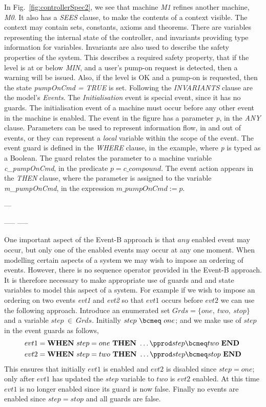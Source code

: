 %
%
%
 In Fig.~\ref{fig:controllerSpec2}, we see that machine \emph{M1} refines another machine, \emph{M0}. It also has a \emph{SEES} clause, to make the contents of a context visible. The context may contain sets, constants, axioms and theorems. There are variables representing the internal state of the controller, and invariants providing type information for variables. Invariants are also used to describe the safety properties of the system. This describes a required safety property, that if the level is at or below \emph{MIN}, and a user's pump-on request is detected, then a warning will be issued. Also, if the level is OK and a pump-on is requested, then the state \emph{pumpOnCmd = TRUE} is  set.  Following the \emph{INVARIANTS} clause are the model's \emph{Events}. The \emph{Initialisation} event is special event, since it has no guards. The initialisation event of a machine must occur before any other event in the machine is enabled. The event in the figure has a parameter \emph{p}, in the \emph{ANY} clause. Parameters can be used to represent information flow, in and out of events, or they can represent a \emph{local} variable within the scope of the event. The event guard is defined in the \emph{WHERE} clause, in the example, where \emph{p} is typed as a Boolean. The guard relates the parameter to a machine variable \emph{c\_pumpOnCmd}, in the predicate $ p = c\_compound$. The event action appears in the \emph{THEN} clause, where the parameter is assigned to the variable \emph{m\_pumpOnCmd}, in the expression $m\_pumpOnCmd := p$.

---




-----
-----

%
%
%
One important aspect of the Event-B approach is that $any$ enabled event may occur, but only one of the enabled events may occur at any one moment. When modelling certain aspects of a system we may wish to impose an ordering of events. However, there is no sequence operator provided in the Event-B approach. It is therefore necessary to make appropriate use of guards and and state variables to model this aspect of a system. For example if we wish to impose an ordering on two events \emph{evt1} and \emph{evt2} so that $evt1$ occurs before $evt2$ we can use the following approach. Introduce an enumerated set $Grds = \{one,~ two,~ stop\}$ and a variable $step~\in~Grds$. Initially $step~\bcmeq~one$; and we make use of $step$ in the event guards as follows,
\begin{equation}
\begin{split}
&evt1 = \textbf{WHEN}~ step = one~ \textbf{THEN}~\ldots\pprod step \bcmeq two~ \textbf{END}\\
&evt2 = \textbf{WHEN}~ step = two~ \textbf{THEN}~\ldots\pprod step \bcmeq stop~ \textbf{END}\\
\end{split}
\notag
\end{equation}
This ensures that initially $evt1$ is enabled and $evt2$ is disabled since $step = one$; only after $evt1$ has updated the $step$ variable  to $two$ is $evt2$ enabled. At this time $evt1$ is no longer enabled since its guard is now false. Finally no events are enabled since $step = stop$ and all guards are false.


